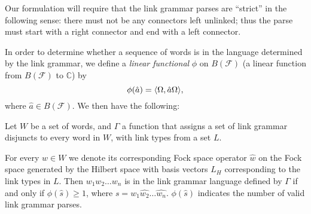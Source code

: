 \documentclass[12pt]{report}
\begin{document}
Our formulation will require that the link grammar parses are ``strict'' in the following sense: there must not be any connectors left unlinked; thus the parse must start with a right connector and end with a left connector.

In order to determine whether a sequence of words is in the language determined by the link grammar, we define a \emph{linear functional} $\phi$ on $B(\mathcal{F})$ (a linear function from $B(\mathcal{F})$ to $\mathbb{C}$) by
$$\phi(\hat{a}) = \langle \Omega, \hat{a}\Omega \rangle,$$
where $\hat{a} \in B(\mathcal{F})$.  We then have the following:
\begin{prop}
Let $W$ be a set of words, and $\Gamma$ a function that assigns a set of link grammar disjuncts to every word in $W$, with link types from a set $L$.

For every $w \in W$ we denote its corresponding Fock space operator $\hat{w}$ on the Fock space generated by the Hilbert space with basis vectors $L_H$  corresponding to the link types in $L$. Then $w_1w_2\ldots w_n$ is in the link grammar language defined by $\Gamma$ if and only if $\phi(\hat{s}) \ge 1$, where $s = \hat{w_1}\hat{w_2}\ldots\hat{w_n}$. $\phi(\hat{s})$ indicates the number of valid link grammar parses.
\end{prop}
\end{document}
